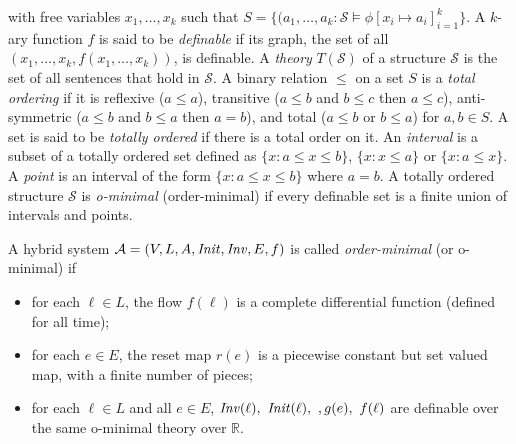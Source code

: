 with free variables $x_{1},\ldots,x_{k}$ such that
$S=\{(a_{1},\ldots,a_{k} : \mathcal{S} \models \phi[x_{i}\mapsto a_{i}]_{i=1}^{k}\}$.
A $k$-ary function $f$ is said to be \emph{definable} if its graph, the set of all $(x_{1},\ldots,x_{k},f(x_{1},\ldots,x_{k}))$, is definable.
A \emph{theory} $T(\mathcal{S})$ of a structure $\mathcal{S}$ is the set of all sentences that hold in $\mathcal{S}$.
A binary relation $\leq$ on a set $S$ is a \emph{total ordering} if it is
reflexive ($a\leq a$), transitive ($a\leq b$ and $b\leq c$ then $a\leq c$), anti-symmetric ($a\leq b$ and $b\leq a$ then $a=b$), and total ($a\leq b$ or $b\leq a$) for $a,b\in S$.
A set is said to be \emph{totally ordered} if there is a total order on it.
An \emph{interval} is a subset of a totally ordered set defined as $\{x : a\leq x\leq b\}$, $\{x : x\leq a\}$ or $\{x : a\leq x\}$.
A \emph{point} is an interval of the form $\{x : a\leq x\leq b\}$ where $a=b$.
A totally ordered structure $\mathcal{S}$ is \emph{o-minimal} (order-minimal) if every definable set is a finite union of intervals and points.


\begin{defi}
A hybrid system $\mathcal{A}=(V,L,A,\mathit{Init},\mathit{Inv},E,f)$ is called \emph{order-minimal} (or o-minimal) if
\begin{itemize}
    \item{for each $\ell\in L$, the flow $f(\ell)$ is a complete differential function (defined for all time);}
    \item{for each $e\in E$, the reset map $r(e)$ is a piecewise constant but set valued map, with a finite number of pieces;}
    \item{for each $\ell\in L$ and all $e\in E$, $\Inv(\ell),\ \Init(\ell),\ , g(e),\ f(\ell)$ are definable over the same o-minimal theory over $\mathbb{R}$.}
\end{itemize}
\end{defi}

